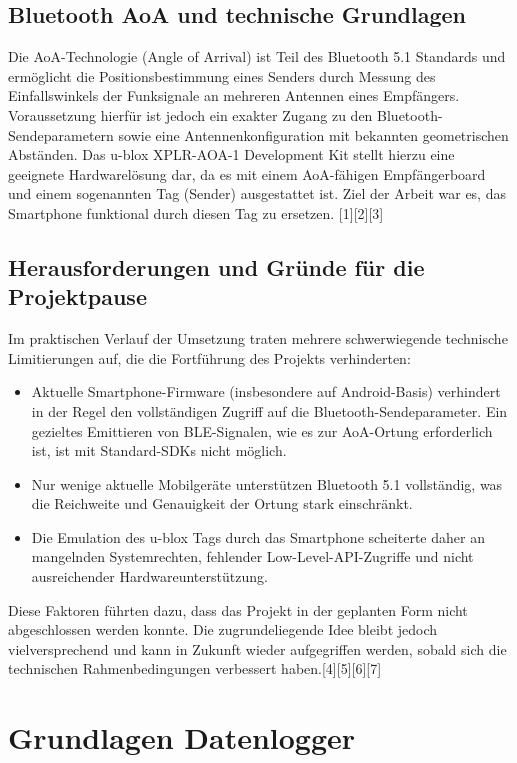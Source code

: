 \documentclass[a4paper, 12pt]{article} %
\begin{document}
\subsection{Bluetooth AoA und technische Grundlagen}
Die AoA-Technologie (Angle of Arrival) ist Teil des Bluetooth 5.1 Standards und ermöglicht die Positionsbestimmung
 eines Senders durch Messung des Einfallswinkels der Funksignale an mehreren Antennen eines Empfängers. 
 Voraussetzung hierfür ist jedoch ein exakter Zugang zu den Bluetooth-Sendeparametern sowie eine Antennenkonfiguration 
 mit bekannten geometrischen Abständen. Das u-blox XPLR-AOA-1 Development Kit stellt hierzu eine geeignete Hardwarelösung dar, 
 da es mit einem AoA-fähigen Empfängerboard und einem sogenannten Tag (Sender) ausgestattet ist. Ziel der Arbeit war es, das Smartphone 
 funktional durch diesen Tag zu ersetzen. [1][2][3]

 \subsection{Herausforderungen und Gründe für die Projektpause}
 Im praktischen Verlauf der Umsetzung traten mehrere schwerwiegende technische Limitierungen auf, die die Fortführung des Projekts verhinderten:

 \begin{itemize}
    \item Aktuelle Smartphone-Firmware (insbesondere auf Android-Basis) verhindert in der Regel den vollständigen Zugriff auf die Bluetooth-Sendeparameter. Ein gezieltes Emittieren von BLE-Signalen, wie es zur AoA-Ortung erforderlich ist, ist mit Standard-SDKs nicht möglich.
    \item Nur wenige aktuelle Mobilgeräte unterstützen Bluetooth 5.1 vollständig, was die Reichweite und Genauigkeit der Ortung stark einschränkt.
    \item Die Emulation des u-blox Tags durch das Smartphone scheiterte daher an mangelnden Systemrechten, fehlender Low-Level-API-Zugriffe und nicht ausreichender Hardwareunterstützung.
 \end{itemize}
Diese Faktoren führten dazu, dass das Projekt in der geplanten Form nicht abgeschlossen werden konnte. 
Die zugrundeliegende Idee bleibt jedoch vielversprechend und kann in Zukunft wieder aufgegriffen werden, sobald sich 
die technischen Rahmenbedingungen verbessert haben.[4][5][6][7]

\clearpage

\section{Grundlagen Datenlogger}
\end{document}
